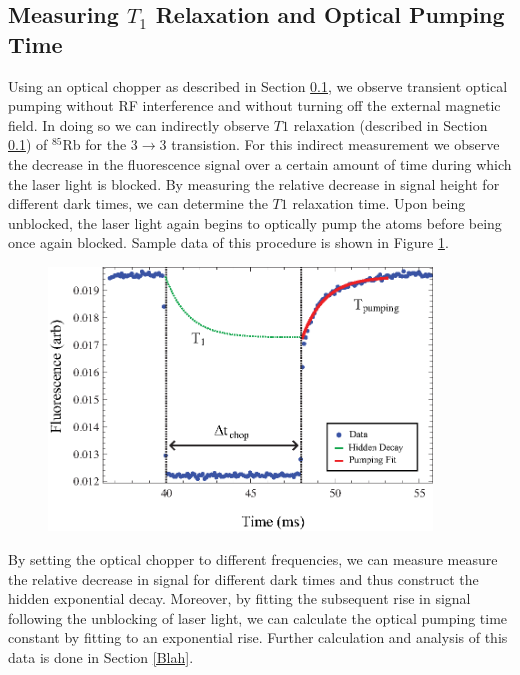 \subsection{Measuring $T_1$ Relaxation and Optical Pumping Time}

Using an optical chopper as described in Section \ref{}, we observe transient optical pumping without RF interference and without turning off the external magnetic field.  In doing so we can indirectly observe $T1$ relaxation (described in Section \ref{}) of $^{85}$Rb for the $3 \rightarrow 3$ transistion.  For this indirect measurement we observe the decrease in the fluorescence signal over a certain amount of time during which the laser light is blocked.  By measuring the relative decrease in signal height for different dark times, we can determine the $T1$ relaxation time. Upon being unblocked, the laser light again begins to optically pump the atoms before being once again blocked.  Sample data of this procedure is shown in Figure \ref{fig:chop}.
\begin{figure}[htbp]
\begin{center}
\includegraphics[height=70mm]{./figures/raw_chop.eps}
\caption{\small{}}
\label{fig:chop}
\end{center}
\end{figure}
By setting the optical chopper to different frequencies, we can measure measure the relative decrease in signal for different dark times and thus construct the hidden exponential decay.  Moreover, by fitting the subsequent rise in signal following the unblocking of laser light, we can calculate the optical pumping time constant by fitting to an exponential rise.  Further calculation and analysis of this data is done in Section \ref{Blah}.

